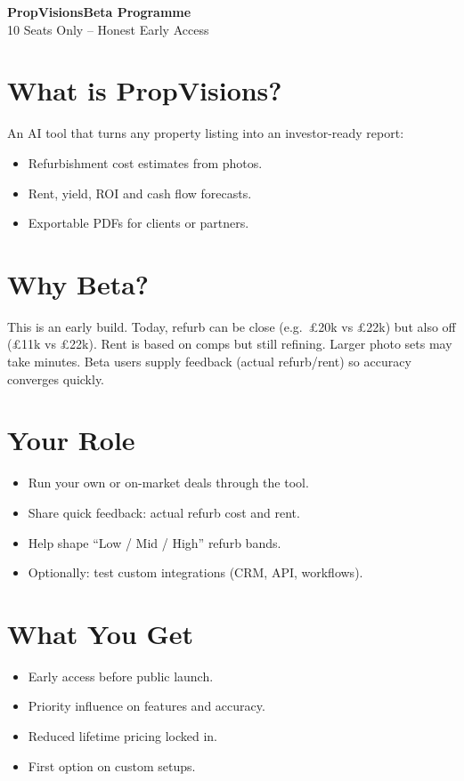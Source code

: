 \documentclass[11pt,a4paper]{article}
\newcommand{\product}{PropVisions}
\begin{document}
\begin{center}
  {\Huge \bfseries \product Beta Programme}\\[4pt]
  {\large 10 Seats Only – Honest Early Access}
\end{center}

\section*{What is \product?}
An AI tool that turns any property listing into an investor-ready report:
\begin{itemize}[leftmargin=*]
  \item Refurbishment cost estimates from photos.
  \item Rent, yield, ROI and cash flow forecasts.
  \item Exportable PDFs for clients or partners.
\end{itemize}

\section*{Why Beta?}
This is an early build. Today, refurb can be close (e.g.\ £20k vs £22k) but also off (£11k vs £22k). Rent is based on comps but still refining. Larger photo sets may take minutes.  
Beta users supply feedback (actual refurb/rent) so accuracy converges quickly.

\section*{Your Role}
\begin{itemize}[leftmargin=*]
  \item Run your own or on-market deals through the tool.
  \item Share quick feedback: actual refurb cost and rent.
  \item Help shape ``Low / Mid / High'' refurb bands.
  \item Optionally: test custom integrations (CRM, API, workflows).
\end{itemize}

\section*{What You Get}
\begin{itemize}[leftmargin=*]
  \item Early access before public launch.
  \item Priority influence on features and accuracy.
  \item Reduced lifetime pricing locked in.
  \item First option on custom setups.
\end{itemize}
\end{document}
